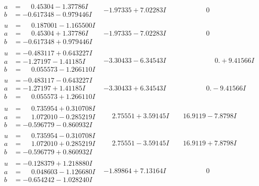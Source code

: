 \documentclass[1p]{elsarticle_modified}
\theoremstyle{definition}
\begin{document}
$$\begin{array}{c|c|c}
\begin{aligned}
a &= \phantom{-}0.45304 - 1.37786 I \\
b &= -0.617348 - 0.979446 I\end{aligned}
 & -1.97335 + 7.02283 I & \phantom{-0.000000 } 0 \\ \hline\begin{aligned}
u &= \phantom{-}0.187001 - 1.165500 I \\
a &= \phantom{-}0.45304 + 1.37786 I \\
b &= -0.617348 + 0.979446 I\end{aligned}
 & -1.97335 - 7.02283 I & \phantom{-0.000000 } 0 \\ \hline\begin{aligned}
u &= -0.483117 + 0.643227 I \\
a &= -1.27197 - 1.41185 I \\
b &= \phantom{-}0.055573 - 1.266110 I\end{aligned}
 & -3.30433 - 6.34543 I & \phantom{-0.000000 -}0. + 9.41566 I \\ \hline\begin{aligned}
u &= -0.483117 - 0.643227 I \\
a &= -1.27197 + 1.41185 I \\
b &= \phantom{-}0.055573 + 1.266110 I\end{aligned}
 & -3.30433 + 6.34543 I & \phantom{-0.000000 } 0. - 9.41566 I \\ \hline\begin{aligned}
u &= \phantom{-}0.735954 + 0.310708 I \\
a &= \phantom{-}1.072010 - 0.285219 I \\
b &= -0.596779 - 0.860932 I\end{aligned}
 & \phantom{-}2.75551 + 3.59145 I & \phantom{-}16.9119 - 7.8798 I \\ \hline\begin{aligned}
u &= \phantom{-}0.735954 - 0.310708 I \\
a &= \phantom{-}1.072010 + 0.285219 I \\
b &= -0.596779 + 0.860932 I\end{aligned}
 & \phantom{-}2.75551 - 3.59145 I & \phantom{-}16.9119 + 7.8798 I \\ \hline\begin{aligned}
u &= -0.128379 + 1.218880 I \\
a &= \phantom{-}0.048603 - 1.126680 I \\
b &= -0.654242 - 1.028240 I\end{aligned}
 & -1.89864 + 7.13164 I & \phantom{-0.000000 } 0 \\ \hline\begin{aligned}

\end{aligned}
\end{array}$$
\end{document}
